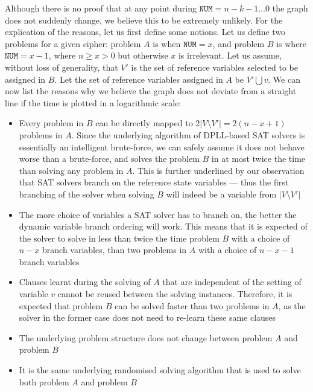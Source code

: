 \documentclass{llncs}
\begin{document}
Although there is no proof that at any point during $\texttt{NUM}=n-k-1\ldots 0$ the graph does not suddenly change, we believe this to be extremely unlikely. For the explication of the reasons, let us first define some notions. Let us define two problems for a given cipher: problem $A$ is when $\texttt{NUM}=x$, and problem $B$ is where $\texttt{NUM}=x-1$, where $n \geq x>0$ but otherwise $x$ is irrelevant. Let us assume, without loss of generality, that $V'$ is the set of reference variables selected to be assigned in $B$. Let the set of reference variables assigned in $A$ be $V' \bigcup v$. We can now list the reasons why we believe the graph does not deviate from a straight line if the time is plotted in a logarithmic scale:
%
\begin{itemize}
 \item Every problem in $B$ can be directly mapped to $2|V\setminus V'|=2(n-x+1)$ problems in $A$. Since the underlying algorithm of DPLL-based SAT solvers is essentially an intelligent brute-force, we can safely assume it does not behave worse than a brute-force, and solves the problem $B$ in at most twice the time than solving any problem in $A$. This is further underlined by our observation that SAT solvers branch on the reference state variables --- thus the first branching of the solver when solving $B$ will indeed be a variable from $|V\setminus V'|$
 
 \item The more choice of variables a SAT solver has to branch on, the better the dynamic variable branch ordering will work. This means that it is expected of the solver to solve in less than twice the time problem $B$ with a choice of $n-x$ branch variables, than two problems in $A$ with a choice of $n-x-1$ branch variables
 
 \item Clauses learnt during the solving of $A$ that are independent of the setting of variable $v$ cannot be reused between the solving instances. Therefore, it is expected that problem $B$ can be solved faster than two problems in $A$, as the solver in the former case does not need to re-learn these same clauses
 
 \item The underlying problem structure does not change between problem $A$ and problem $B$
 
 \item It is the same underlying randomised solving algorithm that is used to solve both problem $A$ and problem $B$
\end{itemize}
\end{document}
